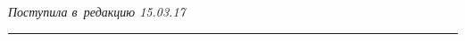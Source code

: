 







\vspace*{-3pt}





\hfill{\small\textit{Поступила в~редакцию 15.03.17}}





























\newpage





\vspace*{-28pt}





\hrule
















\def\tit{LEARNING MANAGEMENT SYSTEM ELIS.\\ ARCHITECTURE SOLUTIONS}





\def\titkol{Learning management system ELIS. Architecture solutions}








\def\aut{A.\,K.~Gorshenin$^{1,2}$, E.\,S.~Danilovich$^2$, and~D.\,R.~Khromov$^2$}


\def\autkol{A.\,K.~Gorshenin, E.\,S.~Danilovich, and~D.\,R.~Khromov}











